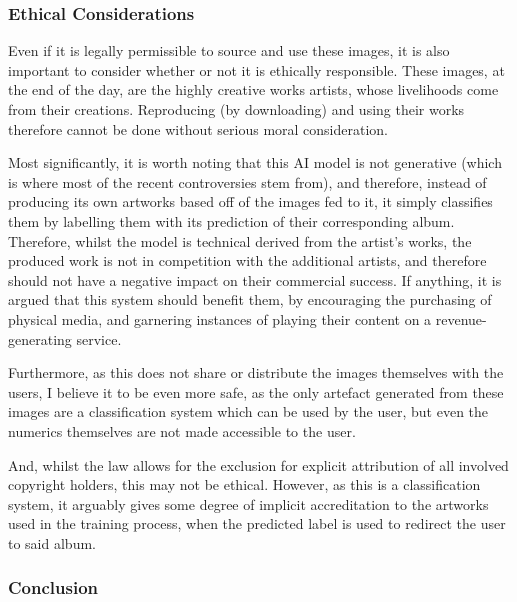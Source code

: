               \subsubsection{Ethical Considerations}
  
                  Even if it is legally permissible to source and use these images, it is also important to consider whether or not it is ethically responsible. These images, at the end of the day, are the highly creative works artists, whose livelihoods come from their creations. Reproducing (by downloading) and using their works therefore cannot be done without serious moral consideration.
  
                  Most significantly, it is worth noting that this AI model is not generative (which is where most of the recent controversies stem from), and therefore, instead of producing its own artworks based off of the images fed to it, it simply classifies them by labelling them with its prediction of their corresponding album. Therefore, whilst the model is technical derived from the artist's works, the produced work is not in competition with the additional artists, and therefore should not have a negative impact on their commercial success. If anything, it is argued that this system should benefit them, by encouraging the purchasing of physical media, and garnering instances of playing their content on a revenue-generating service.
  
                  Furthermore, as this does not share or distribute the images themselves with the users, I believe it to be even more safe, as the only artefact generated from these images are a classification system which can be used by the user, but even the numerics themselves are not made accessible to the user.
  
                  And, whilst the law allows for the exclusion for explicit attribution of all involved copyright holders, this may not be ethical. However, as this is a classification system, it arguably gives some degree of implicit accreditation to the artworks used in the training process, when the predicted label is used to redirect the user to said album.
  
              \subsubsection{Conclusion}
  
